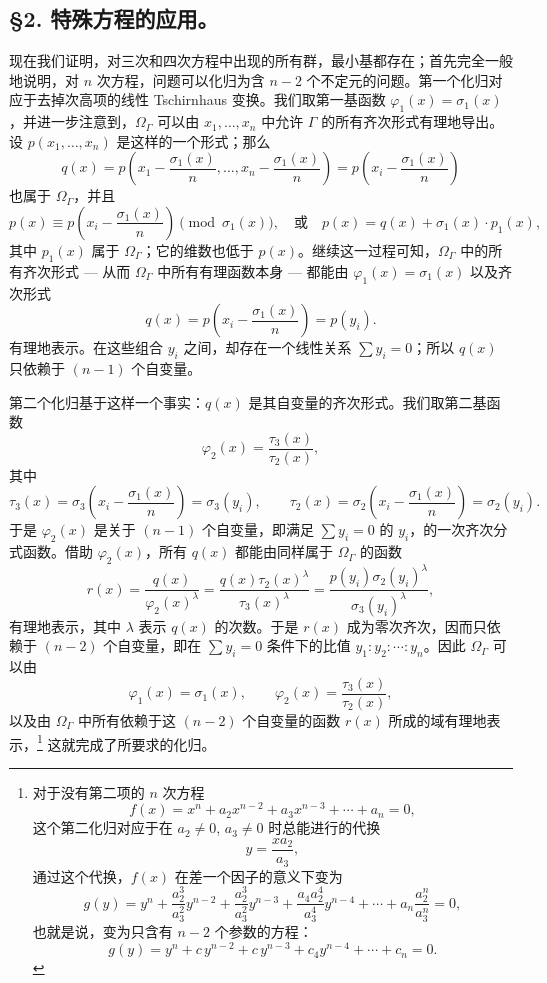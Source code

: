 \subsection*{\S 2. 特殊方程的应用。}

现在我们证明，对三次和四次方程中出现的所有群，最小基都存在；首先完全一般地说明，对 $n$ 次方程，问题可以化归为含 $n-2$ 个不定元的问题。第一个化归对应于去掉次高项的线性 Tschirnhaus 变换。我们取第一基函数 $\varphi_1(x)=\sigma_1(x)$，并进一步注意到，$\Omega_\Gamma$ 可以由 $x_1,
\ldots,x_n$ 中允许 $\Gamma$ 的所有齐次形式有理地导出。设 $p(x_1,
\ldots,x_n)$ 是这样的一个形式；那么
\[
q(x)=p\left(x_1-\frac{\sigma_1(x)}{n},\ldots,x_n-\frac{\sigma_1(x)}{n}\right)=p\left(x_i-\frac{\sigma_1(x)}{n}\right)
\]
也属于 $\Omega_\Gamma$，并且
\[
p(x)\equiv p\left(x_i-\frac{\sigma_1(x)}{n}\right)\pmod{\sigma_1(x)},
\quad\text{或}\quad
p(x)=q(x)+\sigma_1(x)\cdot p_1(x),
\]
其中 $p_1(x)$ 属于 $\Omega_\Gamma$；它的维数也低于 $p(x)$。继续这一过程可知，$\Omega_\Gamma$ 中的所有齐次形式 --- 从而 $\Omega_\Gamma$ 中所有有理函数本身 --- 都能由 $\varphi_1(x)=\sigma_1(x)$ 以及齐次形式
\[
q(x)=p\left(x_i-\frac{\sigma_1(x)}{n}\right)=p(y_i).
\]
有理地表示。在这些组合 $y_i$ 之间，却存在一个线性关系 $\sum y_i=0$；所以 $q(x)$ 只依赖于 $(n-1)$ 个自变量。

第二个化归基于这样一个事实：$q(x)$ 是其自变量的齐次形式。我们取第二基函数
\[
\varphi_2(x)=\frac{\tau_3(x)}{\tau_2(x)},
\]
其中
\[
\tau_3(x)=\sigma_3\left(x_i-\frac{\sigma_1(x)}{n}\right)=\sigma_3(y_i),
\qquad
\tau_2(x)=\sigma_2\left(x_i-\frac{\sigma_1(x)}{n}\right)=\sigma_2(y_i).
\]
于是 $\varphi_2(x)$ 是关于 $(n-1)$ 个自变量，即满足 $\sum y_i=0$ 的 $y_i$，的一次齐次分式函数。借助 $\varphi_2(x)$，所有 $q(x)$ 都能由同样属于 $\Omega_\Gamma$ 的函数
\[
r(x)=\frac{q(x)}{\varphi_2(x)^\lambda}
=\frac{q(x)\tau_2(x)^\lambda}{\tau_3(x)^\lambda}
=\frac{p(y_i)\sigma_2(y_i)^\lambda}{\sigma_3(y_i)^\lambda},
\]
有理地表示，其中 $\lambda$ 表示 $q(x)$ 的次数。于是 $r(x)$ 成为零次齐次，因而只依赖于 $(n-2)$ 个自变量，即在 $\sum y_i=0$ 条件下的比值 $y_1:y_2:\cdots:y_n$。因此 $\Omega_\Gamma$ 可以由
\[
\varphi_1(x)=\sigma_1(x),
\qquad
\varphi_2(x)=\frac{\tau_3(x)}{\tau_2(x)},
\]
以及由 $\Omega_\Gamma$ 中所有依赖于这 $(n-2)$ 个自变量的函数 $r(x)$ 所成的域有理地表示，\footnote{对于没有第二项的 $n$ 次方程
\[
f(x)=x^n+a_2x^{n-2}+a_3x^{n-3}+\cdots+a_n=0,
\]
这个第二化归对应于在 $a_2\ne0$, $a_3\ne0$ 时总能进行的代换
\[
y=\frac{x a_2}{a_3},
\]
通过这个代换，$f(x)$ 在差一个因子的意义下变为
\[
g(y)=y^n+\frac{a_2^3}{a_3^2}y^{n-2}+\frac{a_2^3}{a_3^2}y^{n-3}
+\frac{a_4a_2^4}{a_3^4}y^{n-4}+\cdots+a_n\frac{a_2^n}{a_3^n}=0,
\]
也就是说，变为只含有 $n-2$ 个参数的方程：
\[
g(y)=y^n+c\,y^{n-2}+c\,y^{n-3}+c_4y^{n-4}+\cdots+c_n=0.
\]} 这就完成了所要求的化归。

